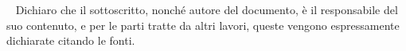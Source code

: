 \documentclass{article}
\begin{document}


\newpage
\
\newpage
\vfill
Dichiaro che il sottoscritto, nonché autore del
documento, è il responsabile del suo contenuto, e per le parti tratte da altri lavori, queste vengono espressamente dichiarate
citando le fonti.
\newpage
\
\newpage
\tableofcontents
\newpage









  

\end{document}
